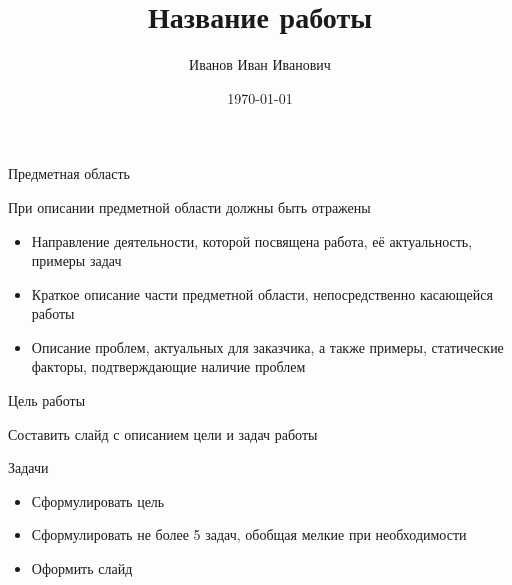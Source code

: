 \documentclass{fefu_presentation}
\author{Иванов Иван Иванович}
\title{Название работы}
\date{\today}
\begin{document}
    
    \presentationtitlepage
    
    
    \begin{frame}{Предметная область}
        \begin{block}{}
            При описании предметной области должны быть отражены
            \begin{itemize}
                \item Направление деятельности, которой посвящена работа, её актуальность, примеры задач
                \item Краткое описание части предметной области, непосредственно касающейся работы
                \item Описание проблем, актуальных для заказчика, а также примеры, статические факторы, подтверждающие наличие проблем
            \end{itemize}
        \end{block}
    \end{frame}

    \note{}
    
    \begin{frame}{Цель работы}
        \begin{block}{}
            Составить слайд с описанием цели и задач работы
        \end{block}
        \begin{block}{Задачи}
            \begin{itemize}
                \item Сформулировать цель
                \item Сформулировать не более 5 задач, обобщая мелкие при необходимости
                \item Оформить слайд
            \end{itemize}
        \end{block}
    \end{frame}

    \note{}
    
\end{document}
